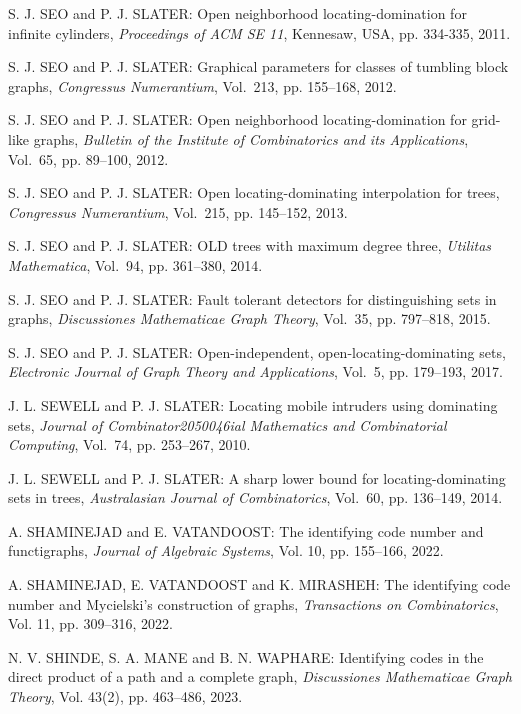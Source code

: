 \begin{thebibliography}{999}
S. J. SEO and P. J. SLATER: Open neighborhood locating-domination for infinite cylinders, {\it Proceedings of ACM SE 11}, Kennesaw, USA, pp. 334-335, 2011.

S. J. SEO and P. J. SLATER: Graphical parameters for classes of tumbling block graphs, {\it Congressus Numerantium}, Vol.~213, pp. 155--168, 2012.

S. J. SEO and P. J. SLATER: Open neighborhood locating-domination for grid-like graphs, {\it Bulletin of the Institute of Combinatorics and its Applications}, Vol.~65, pp. 89--100, 2012.

S. J. SEO and P. J. SLATER: Open locating-dominating interpolation for trees, {\it Congressus Numerantium}, Vol.~215, pp. 145--152, 2013.

S. J. SEO and P. J. SLATER: OLD trees with maximum degree three, {\it Utilitas Mathematica}, Vol.~94, pp. 361--380, 2014.

S. J. SEO and P. J. SLATER: Fault tolerant detectors for distinguishing sets in graphs, {\it Discussiones Mathematicae Graph Theory}, Vol.~35, pp. 797--818, 2015.

S. J. SEO and P. J. SLATER: Open-independent, open-locating-dominating sets, {\it Electronic Journal of Graph Theory and Applications}, Vol.~5, pp. 179--193, 2017.

J. L. SEWELL and P. J. SLATER: Locating mobile intruders using dominating sets, {\it Journal of Combinator2050046ial Mathematics and Combinatorial Computing}, Vol.~74, pp. 253--267, 2010.

J. L. SEWELL and P. J. SLATER: A sharp lower bound for locating-dominating sets in trees, {\it Australasian Journal of Combinatorics}, Vol.~60, pp. 136--149, 2014.

A. SHAMINEJAD and E. VATANDOOST: The identifying code number and functigraphs, {\it Journal of Algebraic Systems}, Vol. 10, pp. 155--166, 2022.

A. SHAMINEJAD, E. VATANDOOST and K. MIRASHEH: The identifying code number and Mycielski's construction of graphs, {\it Transactions on Combinatorics}, Vol. 11, pp. 309--316, 2022.

N. V. SHINDE, S. A. MANE and B. N. WAPHARE: Identifying codes in the direct product of a path and a complete graph, {\it Discussiones Mathematicae Graph Theory}, Vol. 43(2), pp. 463--486, 2023.


\end{thebibliography}
